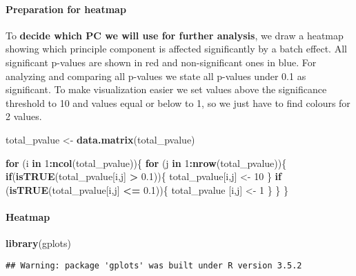 \documentclass[]{article}
\newenvironment{Shaded}{\begin{snugshade}}{\end{snugshade}}
\newcommand{\KeywordTok}[1]{\textcolor[rgb]{0.13,0.29,0.53}{\textbf{#1}}}
\newcommand{\DecValTok}[1]{\textcolor[rgb]{0.00,0.00,0.81}{#1}}
\newcommand{\FloatTok}[1]{\textcolor[rgb]{0.00,0.00,0.81}{#1}}
\newcommand{\StringTok}[1]{\textcolor[rgb]{0.31,0.60,0.02}{#1}}
\newcommand{\ControlFlowTok}[1]{\textcolor[rgb]{0.13,0.29,0.53}{\textbf{#1}}}
\newcommand{\OperatorTok}[1]{\textcolor[rgb]{0.81,0.36,0.00}{\textbf{#1}}}
\newcommand{\NormalTok}[1]{#1}
\let\oldparagraph\paragraph
\renewcommand{\paragraph}[1]{\oldparagraph{#1}\mbox{}}
\begin{document}
\paragraph{Preparation for heatmap}\label{preparation-for-heatmap}

To \textbf{decide which PC we will use for further analysis}, we draw a
heatmap showing which principle component is affected significantly by a
batch effect. All significant p-values are shown in red and
non-significant ones in blue. For analyzing and comparing all p-values
we state all p-values under 0.1 as significant. To make visualization
easier we set values above the significance threshold to 10 and values
equal or below to 1, so we just have to find colours for 2 values.

\begin{Shaded}
\begin{Highlighting}[]
\NormalTok{total_pvalue <-}\StringTok{ }\KeywordTok{data.matrix}\NormalTok{(total_pvalue)}

\ControlFlowTok{for}\NormalTok{ (i }\ControlFlowTok{in} \DecValTok{1}\OperatorTok{:}\KeywordTok{ncol}\NormalTok{(total_pvalue))\{}
  \ControlFlowTok{for}\NormalTok{ (j }\ControlFlowTok{in} \DecValTok{1}\OperatorTok{:}\KeywordTok{nrow}\NormalTok{(total_pvalue))\{}
    \ControlFlowTok{if}\NormalTok{(}\KeywordTok{isTRUE}\NormalTok{(total_pvalue[i,j] }\OperatorTok{>}\StringTok{ }\FloatTok{0.1}\NormalTok{))\{}
\NormalTok{      total_pvalue[i,j] <-}\StringTok{ }\DecValTok{10}
\NormalTok{    \}}
    \ControlFlowTok{if}\NormalTok{ (}\KeywordTok{isTRUE}\NormalTok{(total_pvalue[i,j] }\OperatorTok{<=}\StringTok{ }\FloatTok{0.1}\NormalTok{))\{}
\NormalTok{      total_pvalue [i,j] <-}\StringTok{ }\DecValTok{1}
\NormalTok{    \}}
\NormalTok{  \}}
\NormalTok{\}}
\end{Highlighting}
\end{Shaded}

\paragraph{Heatmap}\label{heatmap}

\begin{Shaded}
\begin{Highlighting}[]
\KeywordTok{library}\NormalTok{(gplots)}
\end{Highlighting}
\end{Shaded}

\begin{verbatim}
## Warning: package 'gplots' was built under R version 3.5.2
\end{verbatim}
\end{document}
